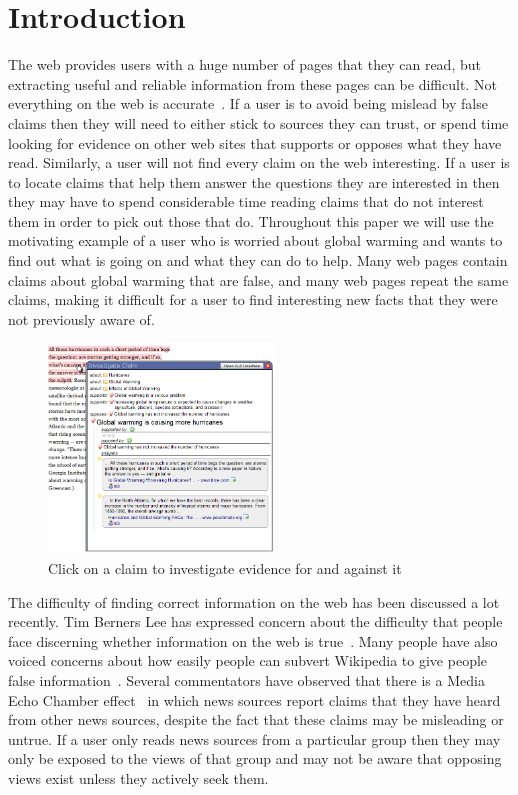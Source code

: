 \documentclass{chi2009}
\begin{document}
\section{Introduction}

The web provides users with a huge number of pages that they can read, but extracting useful and reliable information from these pages can be difficult. Not everything on the web is accurate~\cite{bbcwebwarning}. If a user is to avoid being mislead by false claims then they will need to either stick to sources they can trust, or spend time looking for evidence on other web sites that supports or opposes what they have read. Similarly, a user will not find every claim on the web interesting. If a user is to locate claims that help them answer the questions they are interested in then they may have to spend considerable time reading claims that do not interest them in order to pick out those that do. Throughout this paper we will use the motivating example of a user who is worried about global warming and wants to find out what is going on and what they can do to help. Many web pages contain claims about global warming that are false, and many web pages repeat the same claims, making it difficult for a user to find interesting new facts that they were not previously aware of.

\begin{figure}[tb]
	\begin{center}
	\includegraphics[width=6cm]{../screenshots/claim_popup_crop2.png}
	\caption{Click on a claim to investigate evidence for and against it}
	\label{claimview}
	\end{center}
\end{figure}

The difficulty of finding correct information on the web has been discussed a lot recently. Tim Berners Lee has expressed concern about the difficulty that people face discerning whether information on the web is true~\cite{bbcwebwarning}. Many people have also voiced concerns about how easily people can subvert Wikipedia to give people false information~\cite{wikifalse}. Several commentators have observed that there is a Media Echo Chamber effect~\cite{echochamber,echochamber2} in which news sources report claims that they have heard from other news sources, despite the fact that these claims may be misleading or untrue. If a user only reads news sources from a particular group then they may only be exposed to the views of that group and may not be aware that opposing views exist unless they actively seek them.  
\end{document}
